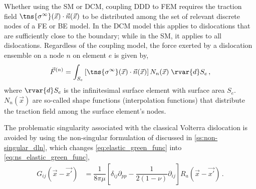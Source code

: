 Whether using the SM or DCM, coupling DDD to FEM requires the traction field $ \tns{\sigma^{\infty}}(\vec{x}) \cdot \vec{n}(\vec{x}) $ to be distributed among the set of relevant discrete nodes of a FE or BE model. In the DCM model this applies to dislocations that are sufficiently close to the boundary; while in the SM, it applies to all dislocations.
Regardless of the coupling model, the force exerted by a dislocation ensemble on a node $ n $ on element $ e $ is given by,
\begin{align}\label{eq:ddd_fem_force_intro}
  \vec{F}^{(n)} = \int_{S_{e}} \left[\tns{\sigma^{\infty}}(\vec{x}) \cdot \vec{n}(\vec{x})\right] N_{n}(\vec{x})\; \rvar{d}S_{e}\,,
\end{align}
where $ \rvar{d}S_{e} $ is the infinitesimal surface element with surface area $ S_{e} $. $ N_{n}(\vec{x}) $ are so-called shape functions (interpolation functions) that distribute the traction field among the surface element's nodes.

The problematic singularity associated with the classical Volterra dislocation is avoided by using the non-singular formulation of \citet{a_non-singular_continuum_theory_of_dislocations} discussed in \cref{ss:non-singular_dln}, which changes \cref{eq:elastic_green_func} into \cref{eq:ns_elastic_green_func},
\begin{align}\label{eq:ns_elastic_green_func}
  G_{ij}(\vec{x} - \vec{x'}) & = \dfrac{1}{8\pi \mu}\left[ \delta_{ij} \partial_{pp} - \dfrac{1}{2(1-\nu)} \partial_{ij} \right] R_{a}(\vec{x} - \vec{x'})\,.
\end{align}


